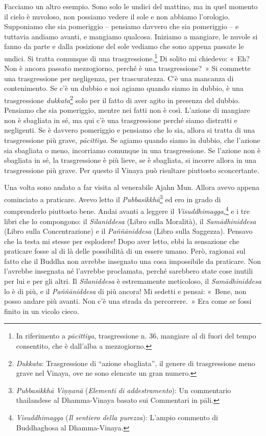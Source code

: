 Facciamo un altro esempio. Sono solo le undici del mattino, ma in quel
momento il cielo è nuvoloso, non possiamo vedere il sole e non abbiamo
l'orologio. Supponiamo che sia pomeriggio -- pensiamo davvero che sia
pomeriggio -- e tuttavia andiamo avanti, e mangiamo qualcosa. Iniziamo a
mangiare, le nuvole si fanno da parte e dalla posizione del sole vediamo
che sono appena passate le undici. Si tratta comunque di una
trasgressione.\footnote{In riferimento a \emph{pācittiya}, trasgressione
  n. 36, mangiare al di fuori del tempo consentito, che è dall'alba a
  mezzogiorno.} Di solito mi chiedevo: «~Eh? Non è ancora passato
mezzogiorno, perché è una trasgressione?~» Si commette una trasgressione
per negligenza, per trascuratezza. C'è una mancanza di contenimento. Se
c'è un dubbio e noi agiamo quando siamo in dubbio, è una trasgressione
\emph{dukkata}\footnote{\emph{Dukkata}: Trasgressione di ``azione
  sbagliata'', il genere di trasgressione meno grave nel Vinaya, ove ne
  sono elencate un gran numero.} solo per il fatto di aver agito in
presenza del dubbio. Pensiamo che sia pomeriggio, mentre nei fatti non è
così. L'azione di mangiare non è sbagliata in sé, ma qui c'è una
trasgressione perché siamo distratti e negligenti. Se è davvero
pomeriggio e pensiamo che lo sia, allora si tratta di una trasgressione
più grave, \emph{pācittiya}. Se agiamo quando siamo in dubbio, che
l'azione sia sbagliata o meno, incorriamo comunque in una trasgressione.
Se l'azione non è sbagliata in sé, la trasgressione è più lieve, se è
sbagliata, si incorre allora in una trasgressione più grave. Per questo
il Vinaya può risultare piuttosto sconcertante.

Una volta sono andato a far visita al venerabile Ajahn Mun. Allora avevo
appena cominciato a praticare. Avevo letto il
\emph{Pubbasikkhā}\footnote{\emph{Pubbasikkhā Viṇṇanā} (\emph{Elementi
  di addestramento}): Un commentario thailandese al Dhamma-Vinaya basato
  sui Commentari in pāli.} ed ero in grado di comprenderlo piuttosto
bene. Andai avanti a leggere il \emph{Visuddhimagga},\footnote{\emph{Visuddhimagga}
  (\emph{Il sentiero della purezza}): L'ampio commento di Buddhaghosa al
  Dhamma-Vinaya.} e i tre libri che lo compongono: il \emph{Sīlaniddesa}
(Libro sulla Moralità), il \emph{Samādhiniddesa} (Libro sulla
Concentrazione) e il \emph{Paññāniddesa} (Libro sulla Saggezza). Pensavo
che la testa mi stesse per esplodere! Dopo aver letto, ebbi la
sensazione che praticare fosse al di là delle possibilità di un essere
umano. Però, ragionai sul fatto che il Buddha non avrebbe insegnato una
cosa impossibile da praticare. Non l'avrebbe insegnata né l'avrebbe
proclamata, perché sarebbero state cose inutili per lui e per gli altri.
Il \emph{Sīlaniddesa} è estremamente meticoloso, il
\emph{Samādhiniddesa} lo è di più, e il \emph{Paññāniddesa} di più
ancora! Mi sedetti e pensai: «~Bene, non posso andare più avanti. Non
c'è una strada da percorrere.~» Era come se fossi finito in un vicolo
cieco.

